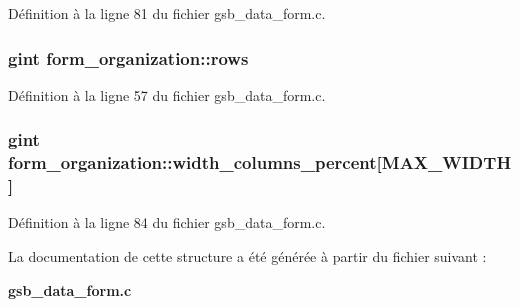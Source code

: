 Définition à la ligne 81 du fichier gsb\_\-data\_\-form.c.

\subsubsection[{rows}]{\setlength{\rightskip}{0pt plus 5cm}gint {\bf form\_\-organization::rows}}\label{structform__organization_ad46c64de9c51bcbbf22606d12b60e37f}


Définition à la ligne 57 du fichier gsb\_\-data\_\-form.c.

\subsubsection[{width\_\-columns\_\-percent}]{\setlength{\rightskip}{0pt plus 5cm}gint {\bf form\_\-organization::width\_\-columns\_\-percent}[MAX\_\-WIDTH]}\label{structform__organization_a2860e560a7a59e289b15d32e49136236}


Définition à la ligne 84 du fichier gsb\_\-data\_\-form.c.



La documentation de cette structure a été générée à partir du fichier suivant :\begin{DoxyCompactItemize}
\item 
{\bf gsb\_\-data\_\-form.c}\end{DoxyCompactItemize}
